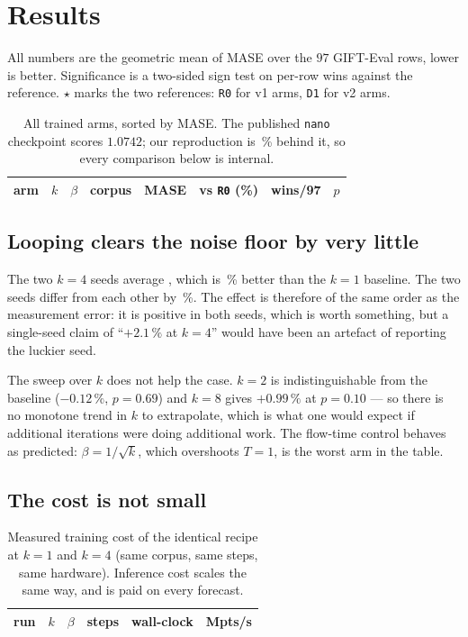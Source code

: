 \section{Results}
\label{sec:results}

All numbers are the geometric mean of MASE over the $97$ GIFT-Eval rows, lower
is better. Significance is a two-sided sign test on per-row wins against the
reference. $\star$ marks the two references: \texttt{R0} for v1 arms,
\texttt{D1} for v2 arms.

\begin{table}[htbp]
  \centering\small
  \caption{All trained arms, sorted by MASE. The published \texttt{nano}
  checkpoint scores $1.0742$; our reproduction is \ReproGap\,\% behind it, so
  every comparison below is internal.}
  \label{tab:arms}
  \begin{tabular}{lcclrrrr}
    \toprule
    arm & $k$ & $\beta$ & corpus & MASE & vs \texttt{R0} (\%) & wins/97 & $p$ \\
    \midrule
    
  \end{tabular}
\end{table}

\subsection{Looping clears the noise floor by very little}

The two $k=4$ seeds average \LoopMean, which is \LoopGain\,\% better than the
$k=1$ baseline. The two seeds differ from each other by
\NoiseFloorKFour\,\%. The effect is therefore of the same order as the
measurement error: it is positive in both seeds, which is worth something, but
a single-seed claim of ``$+2.1\,\%$ at $k=4$'' would have been an artefact of
reporting the luckier seed.

The sweep over $k$ does not help the case. $k=2$ is indistinguishable from the
baseline ($-0.12\,\%$, $p=0.69$) and $k=8$ gives $+0.99\,\%$ at $p=0.10$ --- so
there is no monotone trend in $k$ to extrapolate, which is what one would
expect if additional iterations were doing additional work. The flow-time
control behaves as predicted: $\beta=1/\sqrt{k}$, which overshoots $T=1$, is
the worst arm in the table.

\subsection{The cost is not small}

\begin{table}[htbp]
  \centering\small
  \caption{Measured training cost of the identical recipe at $k=1$ and $k=4$
  (same corpus, same steps, same hardware). Inference cost scales the same
  way, and is paid on every forecast.}
  \label{tab:cost}
  \begin{tabular}{lcclrr}
    \toprule
    run & $k$ & $\beta$ & steps & wall-clock & Mpts/s \\
    \midrule
    
  \end{tabular}
\end{table}

